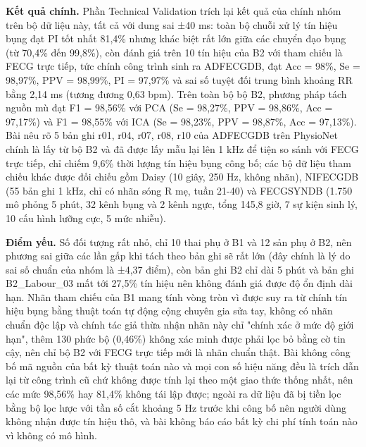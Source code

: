 \documentclass[12pt,a4paper]{article}
\begin{document}
\noindent \textbf{Kết quả chính.} Phần Technical Validation trích lại kết quả của chính nhóm trên bộ dữ liệu này, tất cả với dung sai ±40 ms: toàn bộ chuỗi xử lý tín hiệu bụng đạt PI tốt nhất 81,4\% nhưng khác biệt rất lớn giữa các chuyển đạo bụng (từ 70,4\% đến 99,8\%), còn đánh giá trên 10 tín hiệu của B2 với tham chiếu là FECG trực tiếp, tức chính công trình sinh ra ADFECGDB, đạt Acc = 98\%, Se = 98,97\%, PPV = 98,99\%, PI = 97,97\% và sai số tuyệt đối trung bình khoảng RR bằng 2,14 ms (tương đương 0,63 bpm). Trên toàn bộ bộ B2, phương pháp tách nguồn mù đạt F1 = 98,56\% với PCA (Se = 98,27\%, PPV = 98,86\%, Acc = 97,17\%) và F1 = 98,55\% với ICA (Se = 98,23\%, PPV = 98,87\%, Acc = 97,13\%). Bài nêu rõ 5 bản ghi r01, r04, r07, r08, r10 của ADFECGDB trên PhysioNet chính là lấy từ bộ B2 và đã được lấy mẫu lại lên 1 kHz để tiện so sánh với FECG trực tiếp, chỉ chiếm 9,6\% thời lượng tín hiệu bụng công bố; các bộ dữ liệu tham chiếu khác được đối chiếu gồm Daisy (10 giây, 250 Hz, không nhãn), NIFECGDB (55 bản ghi 1 kHz, chỉ có nhãn sóng R mẹ, tuần 21-40) và FECGSYNDB (1.750 mô phỏng 5 phút, 32 kênh bụng và 2 kênh ngực, tổng 145,8 giờ, 7 sự kiện sinh lý, 10 cấu hình lưỡng cực, 5 mức nhiễu).\par\vspace{3pt}
\noindent \textbf{Điểm yếu.} Số đối tượng rất nhỏ, chỉ 10 thai phụ ở B1 và 12 sản phụ ở B2, nên phương sai giữa các lần gấp khi tách theo bản ghi sẽ rất lớn (đây chính là lý do sai số chuẩn của nhóm là ±4,37 điểm), còn bản ghi B2 chỉ dài 5 phút và bản ghi B2\_Labour\_03 mất tới 27,5\% tín hiệu nên không đánh giá được độ ổn định dài hạn. Nhãn tham chiếu của B1 mang tính vòng tròn vì được suy ra từ chính tín hiệu bụng bằng thuật toán tự động cộng chuyên gia sửa tay, không có nhãn chuẩn độc lập và chính tác giả thừa nhận nhãn này chỉ "chính xác ở mức độ giới hạn", thêm 130 phức bộ (0,46\%) không xác minh được phải lọc bỏ bằng cờ tin cậy, nên chỉ bộ B2 với FECG trực tiếp mới là nhãn chuẩn thật. Bài không công bố mã nguồn của bất kỳ thuật toán nào và mọi con số hiệu năng đều là trích dẫn lại từ công trình cũ chứ không được tính lại theo một giao thức thống nhất, nên các mức 98,56\% hay 81,4\% không tái lập được; ngoài ra dữ liệu đã bị tiền lọc bằng bộ lọc lược với tần số cắt khoảng 5 Hz trước khi công bố nên người dùng không nhận được tín hiệu thô, và bài không báo cáo bất kỳ chi phí tính toán nào vì không có mô hình.\par\vspace{3pt}
\end{document}
